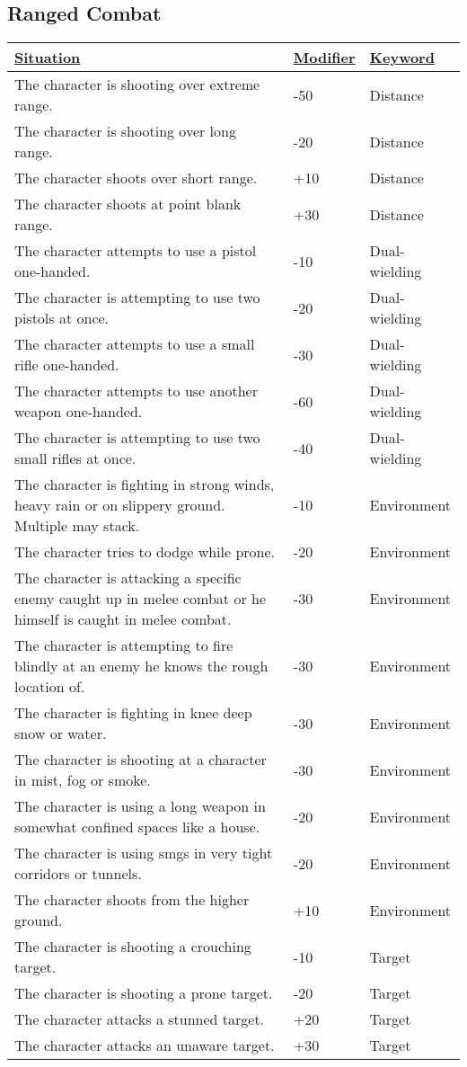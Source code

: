 \subsection{Ranged Combat}
\begin{tabularx}{\textwidth}{|X|l|l|}
	\hline
	\ul{Situation} & \ul{Modifier} & \ul{Keyword} \\ \hline
	The character is shooting over extreme range. & -50 & Distance \\ \hline
	The character is shooting over long range. & -20 & Distance \\ \hline
	The character shoots over short range. & +10 & Distance \\ \hline
	The character shoots at point blank range. & +30 & Distance \\ \hline
	The character attempts to use a pistol one-handed. & -10 & Dual-wielding \\ \hline
	The character is attempting to use two pistols at once. & -20 & Dual-wielding \\ \hline
	The character attempts to use a small rifle one-handed. & -30 & Dual-wielding \\ \hline
	The character attempts to use another weapon one-handed. & -60 & Dual-wielding \\ \hline
	The character is attempting to use two small rifles at once. & -40 & Dual-wielding \\ \hline
	The character is fighting in strong winds, heavy rain or on slippery ground. Multiple may stack. & -10 & Environment \\ \hline
	The character tries to dodge while prone. & -20 & Environment \\ \hline
	The character is attacking a specific enemy caught up in melee combat or he himself is caught in melee combat. & -30 & Environment \\ \hline
	The character is attempting to fire blindly at an enemy he knows the rough location of. & -30 & Environment \\ \hline
	The character is fighting in knee deep snow or water. & -30 & Environment \\ \hline
	The character is shooting at a character in mist, fog or smoke. & -30 & Environment \\ \hline
	The character is using a long weapon in somewhat confined spaces like a house. & -20 & Environment \\ \hline
	The character is using smgs in very tight corridors or tunnels. & -20 & Environment \\ \hline
	The character shoots from the higher ground. & +10 & Environment \\ \hline
	The character is shooting a crouching target. & -10 & Target \\ \hline
	The character is shooting a prone target. & -20 & Target \\ \hline
	The character attacks a stunned target. & +20 & Target \\ \hline
	The character attacks an unaware target. & +30 & Target \\ \hline
\end{tabularx}
